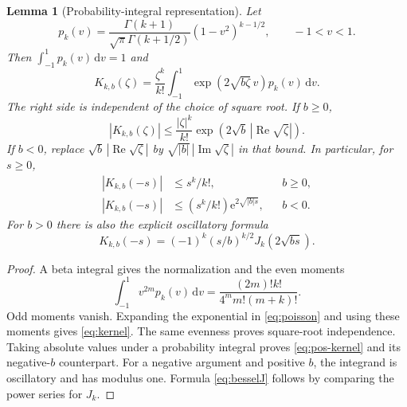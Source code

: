 \documentclass[11pt,a4paper]{article}
\numberwithin{equation}{section}
\newtheorem{lemma}[theorem]{Lemma}
\theoremstyle{definition}
\theoremstyle{remark}
\newcommand{\ee}{\mathrm e}
\newcommand{\dd}{\mathrm d}
\newcommand{\Ree}{\operatorname{Re}}
\newcommand{\Imm}{\operatorname{Im}}
\begin{document}
\begin{lemma}[Probability-integral representation]
\label{lem:kernel}
Let
\[
 p_k(v)=\frac{\Gamma(k+1)}{\sqrt\pi\Gamma(k+1/2)}
                    (1-v^2)^{k-1/2},\qquad -1<v<1.
\]
Then $\int_{-1}^1p_k(v)\,\dd v=1$ and
\begin{equation}
 K_{k,b}(\zeta)=\frac{\zeta^k}{k!}
        \int_{-1}^1\exp(2\sqrt{b\zeta}\,v)p_k(v)\,\dd v.
 \label{eq:poisson}
\end{equation}
The right side is independent of the choice of square root.  If $b\ge0$,
\begin{equation}
 |K_{k,b}(\zeta)|\le\frac{|\zeta|^k}{k!}
                   \exp(2\sqrt b\,|\Ree\sqrt\zeta|).
 \label{eq:pos-kernel}
\end{equation}
If $b<0$, replace $\sqrt b\,|\Ree\sqrt\zeta|$ by
$\sqrt{|b|}\,|\Imm\sqrt\zeta|$ in that bound.  In particular, for $s\ge0$,
\begin{align}
 |K_{k,b}(-s)|&\le s^k/k!,&& b\ge0,\label{eq:osc-bound}\\
 |K_{k,b}(-s)|&\le(s^k/k!)\ee^{2\sqrt{|b|s}},&&b<0.\label{eq:neg-bound}
\end{align}
For $b>0$ there is also the explicit oscillatory formula
\begin{equation}
 K_{k,b}(-s)=(-1)^k(s/b)^{k/2}J_k(2\sqrt{bs}).
 \label{eq:besselJ}
\end{equation}
\end{lemma}
\begin{proof}
A beta integral gives the normalization and the even moments
\[
 \int_{-1}^1v^{2m}p_k(v)\,\dd v
  =\frac{(2m)!k!}{4^m m!(m+k)!}.
\]
Odd moments vanish.  Expanding the exponential in \eqref{eq:poisson}
and using these moments gives \eqref{eq:kernel}.  The same evenness proves
square-root independence.  Taking absolute values under a probability
integral proves \eqref{eq:pos-kernel} and its negative-$b$ counterpart.
For a negative argument and positive $b$, the integrand is oscillatory
and has modulus one.  Formula \eqref{eq:besselJ} follows by comparing the
power series for $J_k$.
\end{proof}
\end{document}

